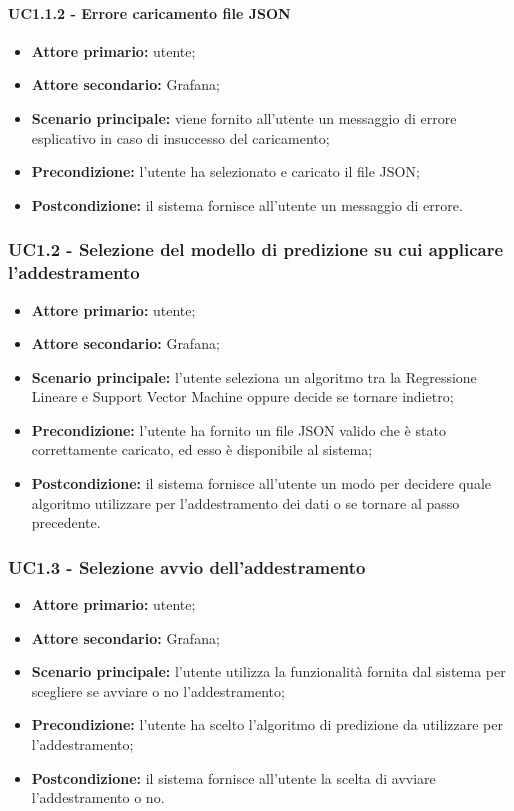 \documentclass{article}
\begin{document}
	\paragraph{UC1.1.2 - Errore caricamento file JSON}
	\begin{itemize}
		\item \textbf{Attore primario:} utente;
		\item \textbf{Attore secondario:} Grafana;
		\item \textbf{Scenario principale:} viene fornito all'utente un messaggio di errore esplicativo in caso di insuccesso del caricamento;
		\item \textbf{Precondizione:} l'utente ha selezionato e caricato il file JSON;
		\item \textbf{Postcondizione:} il sistema fornisce all'utente un messaggio di errore.
	\end{itemize}

	\subsubsection{UC1.2 - Selezione del modello di predizione su cui applicare l'addestramento}
	\begin{itemize}
		\item \textbf{Attore primario:} utente;
		\item \textbf{Attore secondario:} Grafana;
		\item \textbf{Scenario principale:} l'utente seleziona un algoritmo tra la Regressione Lineare e Support Vector Machine oppure decide se tornare indietro;
		\item \textbf{Precondizione:} l'utente ha fornito un file JSON valido che è stato correttamente caricato, ed esso è disponibile al sistema;
		\item \textbf{Postcondizione:} il sistema fornisce all'utente un modo per decidere quale algoritmo utilizzare per l'addestramento dei dati o se tornare al passo precedente.
	\end{itemize}

	\subsubsection{UC1.3 - Selezione avvio dell'addestramento}
	\begin{itemize}
		\item \textbf{Attore primario:} utente;
		\item \textbf{Attore secondario:} Grafana;
		\item \textbf{Scenario principale:} l'utente utilizza la funzionalità fornita dal sistema per scegliere se avviare o no l'addestramento;
		\item \textbf{Precondizione:} l'utente ha scelto l'algoritmo di predizione da utilizzare per l'addestramento;
		\item \textbf{Postcondizione:} il sistema fornisce all'utente la scelta di avviare l'addestramento o no.
	\end{itemize}
\end{document}
